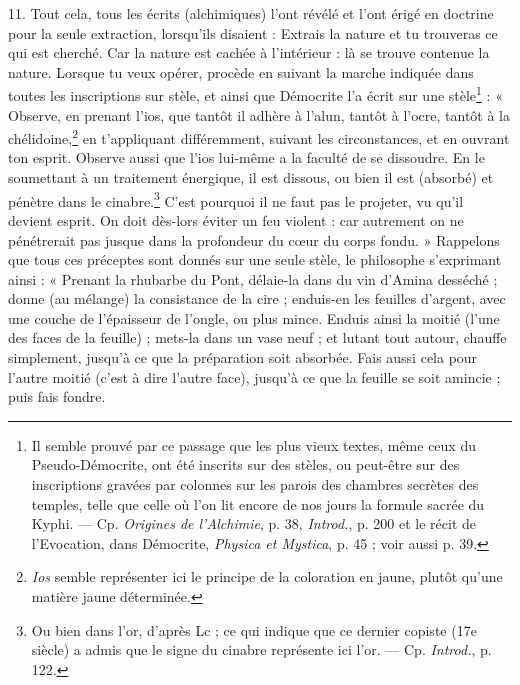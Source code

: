 \documentclass[a4paper, 11pt, oneside, polutonikogreek, french]{article}
\begin{document}
11. Tout cela, tous les écrits (alchimiques) l'ont révélé et l'ont érigé en doctrine pour la seule extraction, lorsqu'ils disaient : Extrais la nature et tu trouveras ce qui est cherché. Car la nature est cachée à l'intérieur : là se trouve contenue la nature. Lorsque tu veux opérer, procède en suivant la marche indiquée dans toutes les inscriptions sur stèle, et ainsi que Démocrite l'a écrit sur une stèle\footnote{Il semble prouvé par ce passage que les plus vieux textes, même ceux du Pseudo-Démocrite, ont été inscrits sur des stèles, ou peut-être sur des inscriptions gravées par colonnes sur les parois des chambres secrètes des temples, telle que celle où l'on lit encore de nos jours la formule sacrée du Kyphi. --- Cp. \emph{Origines de l'Alchimie}, p. 38, \emph{Introd.}, p. 200 et le récit de l'Evocation, dans Démocrite, \emph{Physica et Mystica}, p. 45 ; voir aussi p. 39.} : « Observe, en prenant l'ios, que tantôt il adhère à l'alun, tantôt à l'ocre, tantôt à la chélidoine,\footnote{\emph{Ios} semble représenter ici le principe de la coloration en jaune, plutôt qu'une matière jaune déterminée.} en t'appliquant différemment, suivant les circonstances, et en ouvrant ton esprit. Observe aussi que l'ios lui-même a la faculté de se dissoudre. En le soumettant à un traitement énergique, il est dissous, ou bien il est (absorbé) et pénètre dans le cinabre.\footnote{Ou bien dans l'or, d'après Lc ; ce qui indique que ce dernier copiste (17e siècle) a admis que le signe du cinabre représente ici l'or. --- Cp. \emph{Introd.}, p. 122.} C'est pourquoi il ne faut pas le projeter, vu qu'il devient esprit. On doit dès-lors éviter un feu violent : car autrement on ne pénétrerait pas jusque dans la profondeur du cœur du corps fondu. » Rappelons que tous ces préceptes sont donnés sur une seule stèle, le philosophe s'exprimant ainsi : « Prenant la rhubarbe du Pont, délaie-la dans du vin d'Amina desséché ; donne (au mélange) la consistance de la cire ; enduis-en les feuilles d'argent, avec une couche de l'épaisseur de l'ongle, ou plus mince. Enduis ainsi la moitié (l'une des faces de la feuille) ; mets-la dans un vase neuf ; et lutant tout autour, chauffe simplement, jusqu'à ce que la préparation soit absorbée. Fais aussi cela pour l'autre moitié (c'est à dire l'autre face), jusqu'à ce que la feuille se soit amincie ; puis fais fondre.
\end{document}
